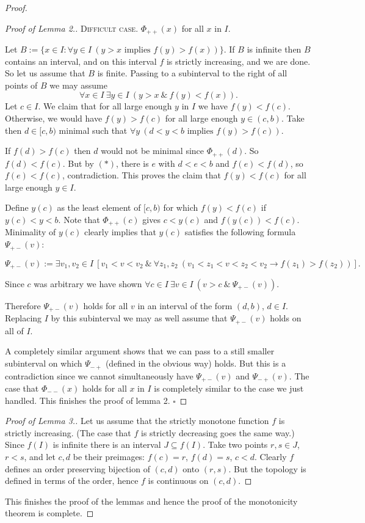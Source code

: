 \documentclass{amsart}
\numberwithin{equation}{subsection}
\theoremstyle{plain}
\theoremstyle{definition}
\theoremstyle{remark}
\begin{document}
\begin{proof}
\begin{proof}[Proof of Lemma 2.]
\noindent\textsc{Difficult case.} $\Phi_{++}(x)$ for all $x$ in $I$.

\noindent Let $B := \{x \in I : \forall y \in I\ (y > x \text{ implies } f(y) > f(x))\}$. If $B$ is infinite then $B$ contains an interval, and on this interval $f$ is strictly increasing, and we are done. So let us assume that $B$ is finite. Passing to a subinterval to the right of all points of $B$ we may assume
\begin{equation}\tag{$\ast$}
\forall x \in I\ \exists y \in I\ (y > x \ \&\ f(y) < f(x)).
\end{equation}
Let $c \in I$. We claim that for all large enough $y$ in $I$ we have $f(y) < f(c)$. Otherwise, we would have $f(y) > f(c)$ for all large enough $y \in (c, b)$. Take then $d \in [c, b)$ minimal such that $\forall y\ (d < y < b \text{ implies } f(y) > f(c))$.

\noindent If $f(d) > f(c)$ then $d$ would not be minimal since $\Phi_{++}(d)$. So $f(d) < f(c)$. But by $(*)$, there is $e$ with $d < e < b$ and $f(e) < f(d)$, so $f(e) < f(c)$, contradiction. This proves the claim that $f(y) < f(c)$ for all large enough $y \in I$.

\noindent Define $y(c)$ as the least element of $[c, b)$ for which $f(y) < f(c)$ if $y(c) < y < b$. Note that $\Phi_{++}(c)$ gives $c < y(c)$ and $f(y(c)) < f(c)$. Minimality of $y(c)$ clearly implies that $y(c)$ satisfies the following formula $\Psi_{+-}(v)$:

\[ \Psi_{+-}(v) := \exists v_1, v_2 \in I\ [v_1 < v < v_2 \ \& \ \forall z_1, z_2\ (v_1 < z_1 < v < z_2 < v_2 \rightarrow f(z_1) > f(z_2))]. \]

\noindent Since $c$ was arbitrary we have shown $\forall c \in I\ \exists v \in I\ (v > c \ \& \ \Psi_{+-}(v))$.

\noindent Therefore $\Psi_{+-}(v)$ holds for all $v$ in an interval of the form $(d, b)$, $d \in I$. Replacing $I$ by this subinterval we may as well assume that $\Psi_{+-}(v)$ holds on all of $I$.

\noindent A completely similar argument shows that we can pass to a still smaller subinterval on which $\Psi_{-+}$ (defined in the obvious way) holds. But this is a contradiction since we cannot simultaneously have $\Psi_{+-}(v)$ and $\Psi_{-+}(v)$. The case that $\Phi_{--}(x)$ holds for all $x$ in $I$ is completely similar to the case we just handled. This finishes the proof of lemma 2. \hfill $\square$


\end{proof}
\begin{proof}[Proof of Lemma 3.] Let us assume that the strictly monotone function $f$ is strictly increasing. (The case that $f$ is strictly decreasing goes the same way.) Since $f(I)$ is infinite there is an interval $J \subseteq f(I)$. Take two points $r, s \in J$, $r < s$, and let $c, d$ be their preimages: $f(c) = r$, $f(d) = s$, $c < d$. Clearly $f$ defines an order preserving bijection of $(c, d)$ onto $(r, s)$. But the topology is defined in terms of the order,
hence $f$ is continuous on $(c, d)$.
\end{proof}
This finishes the proof of the lemmas and hence the proof of the monotonicity
theorem is complete.
\end{proof}
\end{document}
